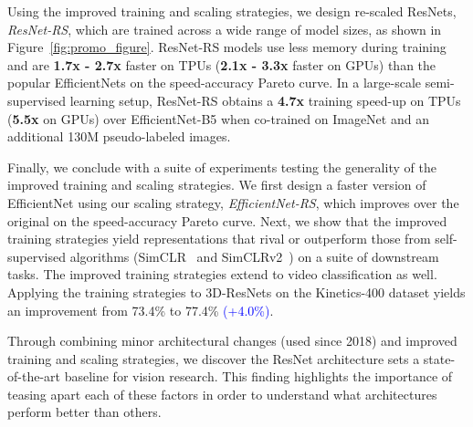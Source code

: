 \documentclass{article}
\begin{document}
Using the improved training and scaling strategies, we design re-scaled ResNets, \emph{ResNet-RS}, which are trained across a wide range of model sizes, as shown in Figure~\ref{fig:promo_figure}.
ResNet-RS models use less memory during training and are \textbf{1.7x - 2.7x} faster on TPUs (\textbf{2.1x - 3.3x} faster on GPUs) than the popular EfficientNets on the speed-accuracy Pareto curve. 
In a large-scale semi-supervised learning setup, ResNet-RS obtains a \textbf{4.7x} training speed-up on TPUs (\textbf{5.5x} on GPUs) over EfficientNet-B5 when co-trained on ImageNet and an additional 130M pseudo-labeled images.

Finally, we conclude with a suite of experiments testing the generality of the improved training and scaling strategies.
We first design a faster version of EfficientNet using our scaling strategy, \emph{EfficientNet-RS}, which improves over the original on the speed-accuracy Pareto curve.
Next, we show that the improved training strategies yield representations that rival or outperform those from self-supervised algorithms (SimCLR~\cite{chen2020simple} and SimCLRv2~\cite{chen2020big}) on a suite of downstream tasks.
The improved training strategies extend to video classification as well.
Applying the training strategies to 3D-ResNets on the Kinetics-400 dataset yields an improvement from 73.4\% to 77.4\% \textcolor{blue}{(+4.0\%)}.

Through combining minor architectural changes (used since 2018) and improved training and scaling strategies, we discover the ResNet architecture sets a state-of-the-art baseline for vision research. 
This finding highlights the importance of teasing apart each of these factors in order to understand what architectures perform better than others.
\end{document}
